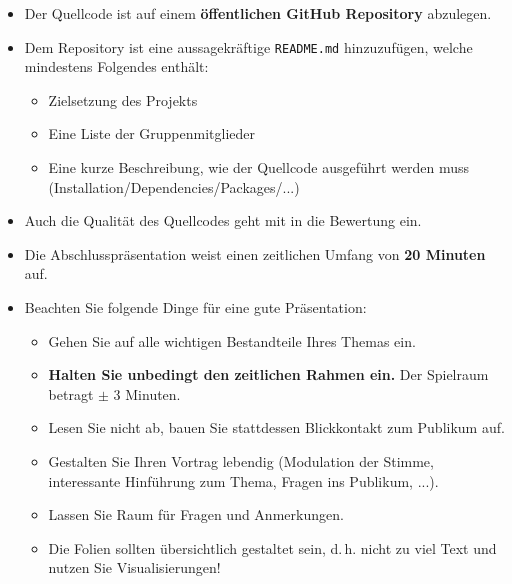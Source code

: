 \begin{frame}
	\begin{itemize}
		\item Der Quellcode ist auf einem \textbf{öffentlichen GitHub Repository} abzulegen.
		\item Dem Repository ist eine aussagekräftige \texttt{README.md} hinzuzufügen, welche mindestens Folgendes enthält:
		\begin{itemize}
			\item Zielsetzung des Projekts
			\item Eine Liste der Gruppenmitglieder
			\item Eine kurze Beschreibung, wie der Quellcode ausgeführt werden muss (Installation/Dependencies/Packages/...)
		\end{itemize}
		\item Auch die Qualität des Quellcodes geht mit in die Bewertung ein.
	\end{itemize}
	
\end{frame}


\begin{frame}
	\begin{itemize}
		\item Die Abschlusspräsentation weist einen zeitlichen Umfang von \textbf{20 Minuten} auf.
		\item Beachten Sie folgende Dinge für eine gute Präsentation:
		\begin{itemize}
			\item Gehen Sie auf alle wichtigen Bestandteile Ihres Themas ein.
			\item \textbf{Halten Sie unbedingt den zeitlichen Rahmen ein.} Der Spielraum betragt $\pm$ 3 Minuten.
			\item Lesen Sie nicht ab, bauen Sie stattdessen Blickkontakt zum Publikum auf.
			\item Gestalten Sie Ihren Vortrag lebendig (Modulation der Stimme, interessante Hinführung zum Thema, Fragen ins Publikum, ...).
			\item Lassen Sie Raum für Fragen und Anmerkungen.
			\item Die Folien sollten übersichtlich gestaltet sein, d.\,h. nicht zu viel Text und nutzen Sie Visualisierungen!
		\end{itemize}
	\end{itemize}
\end{frame}


